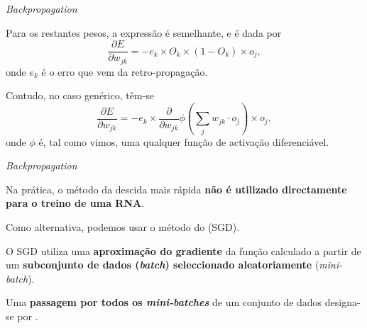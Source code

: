\begin{frame}{\textit{Backpropagation} \cont}

Para os restantes pesos, a expressão é semelhante, e é dada por 
\begin{equation*}
    \frac{\partial E}{\partial w_{jk}} = -e_k \times O_k \times (1-O_k) \times o_j,
\end{equation*}
onde $e_k$ é o erro que vem da retro-propagação. 

\pauseskip

Contudo, no caso genérico, têm-se
\begin{equation*}
	\frac{\partial E}{\partial w_{jk}} = -e_k \times \frac{\partial}{\partial w_{jk}}\phi\left(\sum_j  w_{jk} \cdot o_{j}\right)\times o_j,
\end{equation*}
onde $\phi$ é, tal como vimos, uma qualquer função de activação diferenciável.  

\end{frame}

\begin{frame}{\textit{Backpropagation} \cont}
    
    Na prática, o método da descida mais rápida \textbf{não é utilizado directamente para o treino de uma RNA}.
    
    \pauseskip
    
    Como alternativa, podemos usar o método do  (SGD). 
    
    \pauseskip
    
    O SGD utiliza uma \textbf{aproximação do gradiente} da função calculado a partir de um \textbf{subconjunto de dados (\textit{batch}) seleccionado aleatoriamente} (\textit{mini-batch}).
    
    \pauseskip
    
    Uma \textbf{passagem por todos os \textit{mini-batches}} de um conjunto de dados designa-se por .
    
\end{frame}

